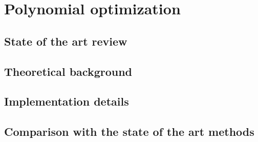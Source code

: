 \chapter{Polynomial optimization}

\section{State of the art review}

\section{Theoretical background}

\section{Implementation details}

\section{Comparison with the state of the art methods}
